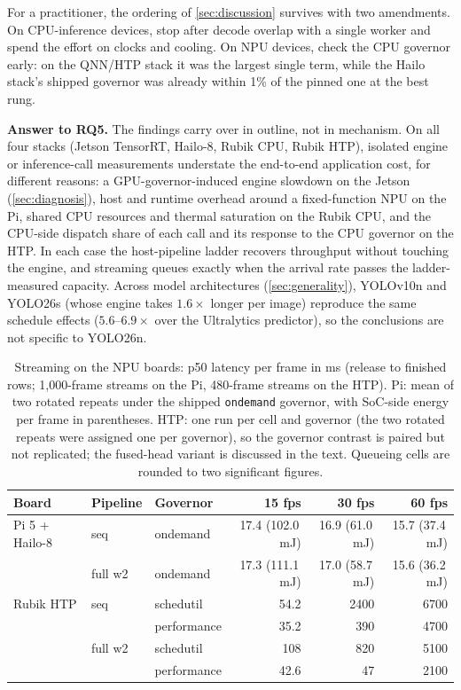 For a practitioner, the ordering of \cref{sec:discussion} survives
with two amendments. On CPU-inference devices, stop after decode
overlap with a single worker and spend the effort on clocks and
cooling. On NPU devices, check the CPU governor early: on the QNN/HTP
stack it was the largest single term, while the Hailo stack's shipped
governor was already within 1\% of the pinned one at the best rung.

\textbf{Answer to RQ5.}
The findings carry over in outline, not in mechanism. On all four
stacks (Jetson TensorRT, Hailo-8, Rubik CPU, Rubik HTP), isolated
engine or inference-call measurements understate the end-to-end
application cost, for different reasons: a GPU-governor-induced
engine slowdown on the Jetson (\cref{sec:diagnosis}), host and runtime
overhead around a fixed-function NPU on the Pi, shared CPU resources
and thermal saturation on the Rubik CPU, and the CPU-side dispatch
share of each call and its response to the CPU governor on the HTP.
In each case the host-pipeline ladder recovers throughput without
touching the engine, and streaming queues exactly when the arrival
rate passes the ladder-measured capacity. Across model architectures
(\cref{sec:generality}), YOLOv10n and YOLO26s (whose engine takes
$1.6\times$ longer per image) reproduce the same schedule effects
($5.6$--$6.9\times$ over the Ultralytics predictor), so the
conclusions are not specific to YOLO26n.

\begin{table}[t]
\centering
\caption{Streaming on the NPU boards: p50 latency per frame in ms
(release to finished rows; 1,000-frame streams on the Pi, 480-frame
streams on the HTP). Pi: mean of two rotated
repeats under the shipped \texttt{ondemand} governor, with SoC-side
energy per frame in parentheses. HTP: one run per cell and governor
(the two rotated repeats were assigned one per governor), so the
governor contrast is paired but not replicated; the fused-head variant
is discussed in the text. Queueing cells are
rounded to two significant figures.}
\label{tab:streamreplication}
\small
\begin{tabular}{@{}lllrrr@{}}
\toprule
Board & Pipeline & Governor & 15 fps & 30 fps & 60 fps \\
\midrule
Pi 5 + Hailo-8 & seq     & ondemand    & 17.4 (102.0\,mJ) & 16.9 (61.0\,mJ) & 15.7 (37.4\,mJ) \\
               & full w2 & ondemand    & 17.3 (111.1\,mJ) & 17.0 (58.7\,mJ) & 15.6 (36.2\,mJ) \\
\midrule
Rubik HTP      & seq     & schedutil   &  54.2 & 2400 & 6700 \\
               &         & performance &  35.2 & 390 & 4700 \\
               & full w2 & schedutil   & 108 & 820 & 5100 \\
               &         & performance & 42.6 & 47 & 2100 \\
\bottomrule
\end{tabular}
\end{table}
